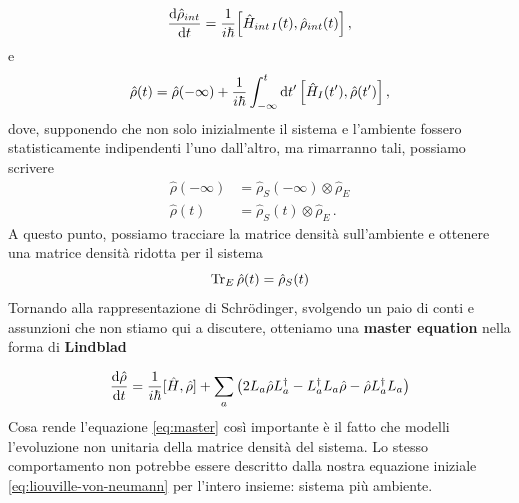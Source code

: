 \begin{equation*}
    \dv{\hat \rho_{int}}{t}=\frac{1}{i\hbar}\comm{\hat H_{int\,I}(t)}{\hat \rho_{int}(t)} \, ,
\end{equation*}
e
\begin{equation*}
    \hat \rho(t) = \hat \rho (-\infty) + \frac{1}{i\hbar}\int_{-\infty}^t \dd{t'}\comm{\hat H_{I}(t')}{\hat \rho(t')} \, ,
\end{equation*}
dove, supponendo che non solo inizialmente il sistema e l'ambiente fossero statisticamente indipendenti l'uno dall'altro, ma rimarranno tali, possiamo scrivere
\begin{align*}
    \hat \rho(-\infty) &= \hat \rho_S(-\infty)\otimes\hat\rho_E \\
    \hat \rho (t) &= \hat \rho_S(t)\otimes\hat\rho_E \, .
\end{align*}
A questo punto, possiamo tracciare la matrice densità sull'ambiente e ottenere una matrice densità ridotta per il sistema
\begin{equation*}
    \Tr_E\hat \rho(t) = \hat \rho_S(t)
\end{equation*}
Tornando alla rappresentazione di Schrödinger, svolgendo un paio di conti e assunzioni che non stiamo qui a discutere, otteniamo una \textbf{master equation} nella forma di \textbf{Lindblad}

\begin{equation}
    \dv{\hat\rho}{t} = \frac {1}{i\hbar} [\hat H, \hat \rho] + \sum_a \left( 2L_a \hat \rho L_a^\dagger - L_a^\dagger L_a\hat \rho - \hat \rho L_a^\dagger L_a\right)
    \label{eq:master}
\end{equation}
Cosa rende l'equazione \eqref{eq:master} così importante è il fatto che modelli l'evoluzione non unitaria della matrice densità del sistema. Lo stesso comportamento non potrebbe essere descritto dalla nostra equazione iniziale \eqref{eq:liouville-von-neumann} per l'intero insieme: sistema più ambiente.

